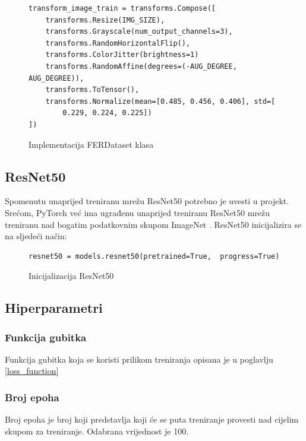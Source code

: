 \documentclass[times, utf8, zavrsni,numeric,pstricks]{fer}
\begin{document}
\begin{figure}[H]
\centering

\begin{Verbatim}[fontsize=\small]
transform_image_train = transforms.Compose([
    transforms.Resize(IMG_SIZE),
    transforms.Grayscale(num_output_channels=3),
    transforms.RandomHorizontalFlip(),
    transforms.ColorJitter(brightness=1)
    transforms.RandomAffine(degrees=(-AUG_DEGREE, AUG_DEGREE)),
    transforms.ToTensor(),
    transforms.Normalize(mean=[0.485, 0.456, 0.406], std=[
        0.229, 0.224, 0.225])
])
\end{Verbatim}
\caption{Implementacija FERDataset klasa}
\label{pic:pytorch_transform_aug}
\end{figure}





\subsection{ResNet50}

Spomenutu unaprijed treniranu mrežu ResNet50 potrebno je uvesti u projekt. Srećom, PyTorch već ima ugrađenu unaprijed treniranu ResNet50 mrežu treniranu nad bogatim podatkovnim skupom ImageNet \cite{imagenet}. ResNet50 inicijalizira se na sljedeći način:

\begin{figure}[H]
\centering

\begin{Verbatim}[fontsize=\small]
resnet50 = models.resnet50(pretrained=True,  progress=True)
\end{Verbatim}
\caption{Inicijalizacija ResNet50}
\label{pic:init_resnet}
\end{figure}

\subsection{Hiperparametri}

\subsubsection{Funkcija gubitka}
Funkcija gubitka koja se koristi prilikom treniranja opisana je u poglavlju \ref{loss_function}

\subsubsection{Broj epoha}
Broj epoha  je broj koji predstavlja koji će se puta treniranje provesti nad cijelim skupom za treniranje. Odabrana vrijednost je 100. 
\end{document}
